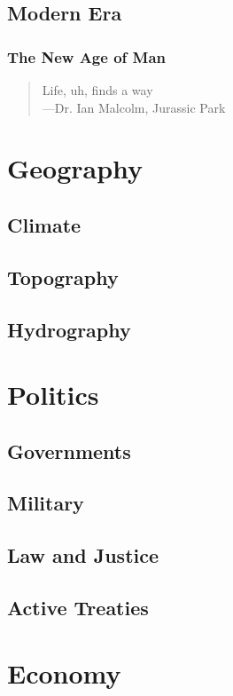 \documentclass[11pt]{article}
\begin{document}
\subsection{Modern Era}
\label{sec:org71db4fc}
\subsubsection{The New Age of Man}
\label{sec:org3afaaba}
\begin{quote}
Life, uh, finds a way \\
---Dr. Ian Malcolm, Jurassic Park
\end{quote}
\section{Geography}
\label{sec:orge100106}
\subsection{Climate}
\label{sec:org27336ad}
\subsection{Topography}
\label{sec:org2736a9c}
\subsection{Hydrography}
\label{sec:org87a22c0}
\section{Politics}
\label{sec:org142a14c}
\subsection{Governments}
\label{sec:orgf585d61}
\subsection{Military}
\label{sec:org2d56a5c}
\subsection{Law and Justice}
\label{sec:org1aff790}
\subsection{Active Treaties}
\label{sec:orgdbf48a2}
\section{Economy}
\label{sec:org512ea7b}
\end{document}
